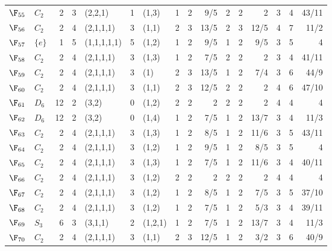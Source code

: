 \begin{landscape}
{\begin{longtable}{@{}l l r r l r l rrr rrr rrr@{}}
\addlinespace[3pt]
\textbf{$\F_{55}$} & $C_{2}$ & 2 & 3 & (2,2,1) & 1 & (1,3) & 1 & 2 & 9/5 & 2 & 2 & 2 & 3 & 4 & 43/11 \\
\addlinespace[3pt]
\textbf{$\F_{56}$} & $C_{2}$ & 2 & 4 & (2,1,1,1) & 3 & (1,1) & 2 & 3 & 13/5 & 2 & 3 & 12/5 & 4 & 7 & 11/2 \\
\addlinespace[3pt]
\textbf{$\F_{57}$} & $\{e\}$ & 1 & 5 & (1,1,1,1,1) & 5 & (1,2) & 1 & 2 & 9/5 & 1 & 2 & 9/5 & 3 & 5 & 4 \\
\addlinespace[3pt]
\textbf{$\F_{58}$} & $C_{2}$ & 2 & 4 & (2,1,1,1) & 3 & (1,3) & 1 & 2 & 7/5 & 2 & 2 & 2 & 3 & 4 & 41/11 \\
\addlinespace[3pt]
\textbf{$\F_{59}$} & $C_{2}$ & 2 & 4 & (2,1,1,1) & 3 & (1) & 2 & 3 & 13/5 & 1 & 2 & 7/4 & 3 & 6 & 44/9 \\
\addlinespace[3pt]
\textbf{$\F_{60}$} & $C_{2}$ & 2 & 4 & (2,1,1,1) & 3 & (1,1) & 2 & 3 & 12/5 & 2 & 2 & 2 & 4 & 6 & 47/10 \\
\addlinespace[3pt]
\textbf{$\F_{61}$} & $D_{6}$ & 12 & 2 & (3,2) & 0 & (1,2) & 2 & 2 & 2 & 2 & 2 & 2 & 4 & 4 & 4 \\
\addlinespace[3pt]
\textbf{$\F_{62}$} & $D_{6}$ & 12 & 2 & (3,2) & 0 & (1,4) & 1 & 2 & 7/5 & 1 & 2 & 13/7 & 3 & 4 & 11/3 \\
\addlinespace[3pt]
\textbf{$\F_{63}$} & $C_{2}$ & 2 & 4 & (2,1,1,1) & 3 & (1,3) & 1 & 2 & 8/5 & 1 & 2 & 11/6 & 3 & 5 & 43/11 \\
\addlinespace[3pt]
\textbf{$\F_{64}$} & $C_{2}$ & 2 & 4 & (2,1,1,1) & 3 & (1,2) & 1 & 2 & 9/5 & 1 & 2 & 8/5 & 3 & 5 & 4 \\
\addlinespace[3pt]
\textbf{$\F_{65}$} & $C_{2}$ & 2 & 4 & (2,1,1,1) & 3 & (1,3) & 1 & 2 & 7/5 & 1 & 2 & 11/6 & 3 & 4 & 40/11 \\
\addlinespace[3pt]
\textbf{$\F_{66}$} & $C_{2}$ & 2 & 4 & (2,1,1,1) & 3 & (1,2) & 2 & 2 & 2 & 2 & 2 & 2 & 4 & 4 & 4 \\
\addlinespace[3pt]
\textbf{$\F_{67}$} & $C_{2}$ & 2 & 4 & (2,1,1,1) & 3 & (1,2) & 1 & 2 & 8/5 & 1 & 2 & 7/5 & 3 & 5 & 37/10 \\
\addlinespace[3pt]
\textbf{$\F_{68}$} & $C_{2}$ & 2 & 4 & (2,1,1,1) & 3 & (1,2) & 1 & 2 & 7/5 & 1 & 2 & 5/3 & 3 & 4 & 39/11 \\
\addlinespace[3pt]
\textbf{$\F_{69}$} & $S_{3}$ & 6 & 3 & (3,1,1) & 2 & (1,2,1) & 1 & 2 & 7/5 & 1 & 2 & 13/7 & 3 & 4 & 11/3 \\
\addlinespace[3pt]
\textbf{$\F_{70}$} & $C_{2}$ & 2 & 4 & (2,1,1,1) & 3 & (1,1) & 2 & 3 & 12/5 & 1 & 2 & 3/2 & 3 & 6 & 40/9 \\

\end{longtable}}
\end{landscape}
